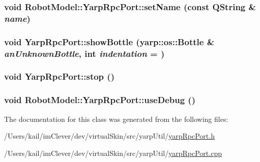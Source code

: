\label{class_robot_model_1_1_yarp_rpc_port_a3e4c1be7ae685d9478b38d71255b1bcd}
\hypertarget{class_robot_model_1_1_yarp_rpc_port_aa30cabbf5681b128766ad8556c33cd65}{
\subsubsection[{setName}]{\setlength{\rightskip}{0pt plus 5cm}void RobotModel::YarpRpcPort::setName (const QString \& {\em name})}}
\label{class_robot_model_1_1_yarp_rpc_port_aa30cabbf5681b128766ad8556c33cd65}
\hypertarget{class_robot_model_1_1_yarp_rpc_port_ae26626cb99ca15bfec5e5162845018c2}{
\subsubsection[{showBottle}]{\setlength{\rightskip}{0pt plus 5cm}void YarpRpcPort::showBottle (yarp::os::Bottle \& {\em anUnknownBottle}, \/  int {\em indentation} = {})}}
\label{class_robot_model_1_1_yarp_rpc_port_ae26626cb99ca15bfec5e5162845018c2}
\hypertarget{class_robot_model_1_1_yarp_rpc_port_a1554e6c2e38cb71f2521280f65bbab05}{
\subsubsection[{stop}]{\setlength{\rightskip}{0pt plus 5cm}void YarpRpcPort::stop ()}}
\label{class_robot_model_1_1_yarp_rpc_port_a1554e6c2e38cb71f2521280f65bbab05}
\hypertarget{class_robot_model_1_1_yarp_rpc_port_a6fe22d6e8403cb3560964dd31d66c243}{
\subsubsection[{useDebug}]{\setlength{\rightskip}{0pt plus 5cm}void RobotModel::YarpRpcPort::useDebug ()}}
\label{class_robot_model_1_1_yarp_rpc_port_a6fe22d6e8403cb3560964dd31d66c243}


The documentation for this class was generated from the following files:\begin{DoxyCompactItemize}
\item 
/Users/kail/imClever/dev/virtualSkin/src/yarpUtil/\hyperlink{yarp_rpc_port_8h}{yarpRpcPort.h}\item 
/Users/kail/imClever/dev/virtualSkin/src/yarpUtil/\hyperlink{yarp_rpc_port_8cpp}{yarpRpcPort.cpp}\end{DoxyCompactItemize}
